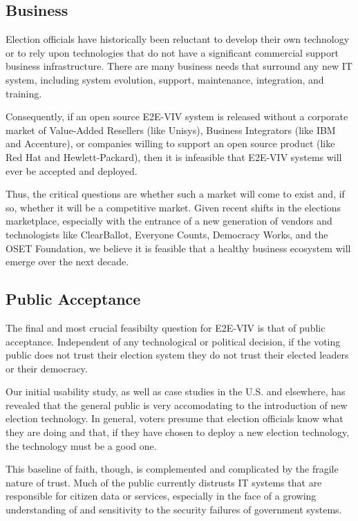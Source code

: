 \subsection{Business}
\label{sec:business}

Election officials have historically been reluctant to develop their
own technology or to rely upon technologies that do not have a
significant commercial support business infrastructure. There are many
business needs that surround any new IT system, including system
evolution, support, maintenance, integration, and training.

Consequently, if an open source E2E-VIV system is released without a
corporate market of Value-Added Resellers (like Unisys), Business
Integrators (like IBM and Accenture), or companies willing to support
an open source product (like Red Hat and Hewlett-Packard), then it is
infeasible that E2E-VIV systems will ever be accepted and deployed.

Thus, the critical questions are whether such a market will come to
exist and, if so, whether it will be a competitive market. Given
recent shifts in the elections marketplace, especially with the
entrance of a new generation of vendors and technologists like
ClearBallot, Everyone Counts, Democracy Works, and the OSET
Foundation, we believe it is feasible that a healthy business
ecosystem will emerge over the next decade.

\subsection{Public Acceptance}

The final and most crucial feasibilty question for E2E-VIV is that of
public acceptance.  Independent of any technological or political
decision, if the voting public does not trust their election system
they do not trust their elected leaders or their democracy.

Our initial usability study, as well as case studies in the U.S. and
elsewhere, has revealed that the general public is very accomodating
to the introduction of new election technology.  In general, voters
presume that election officials know what they are doing and that, if
they have chosen to deploy a new election technology, the technology
must be a good one.

This baseline of faith, though, is complemented and complicated by the
fragile nature of trust. Much of the public currently distrusts IT
systems that are responsible for citizen data or services, especially
in the face of a growing understanding of and sensitivity to the
security failures of government systems.

